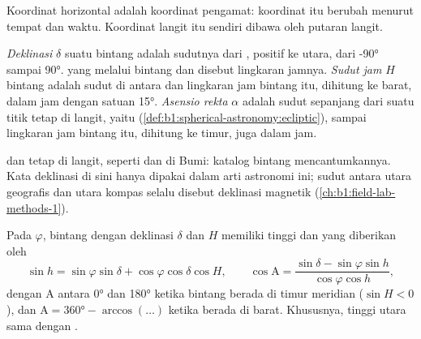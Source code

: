 Koordinat horizontal adalah koordinat pengamat: koordinat itu berubah menurut tempat dan waktu. Koordinat langit itu sendiri dibawa oleh putaran langit.

\begin{definition}\label{def:b1:spherical-astronomy:equatorial}
\emph{Deklinasi} $\delta$ suatu bintang adalah sudutnya dari , positif ke utara, dari \ang{-90} sampai \ang{90}.  yang melalui bintang dan  disebut lingkaran jamnya. \emph{Sudut jam} $H$ bintang adalah sudut di  antara  dan lingkaran jam bintang itu, dihitung ke barat, dalam jam dengan satuan \ang{15}. \emph{Asensio rekta} $\alpha$ adalah sudut sepanjang  dari suatu titik tetap di langit, yaitu  (\cref{def:b1:spherical-astronomy:ecliptic}), sampai lingkaran jam bintang itu, dihitung ke timur, juga dalam jam.
\end{definition}

 dan  tetap di langit, seperti  dan  di Bumi: katalog bintang mencantumkannya. Kata deklinasi di sini hanya dipakai dalam arti astronomi ini; sudut antara utara geografis dan utara kompas selalu disebut deklinasi magnetik (\cref{ch:b1:field-lab-methods-1}).

\begin{proposition}\label{prop:b1:spherical-astronomy:transform}
Pada  $\varphi$, bintang dengan deklinasi $\delta$ dan  $H$ memiliki tinggi dan  yang diberikan oleh
\[
  \sin h = \sin\varphi\sin\delta + \cos\varphi\cos\delta\cos H,
  \qquad
  \cos\mathrm{A} = \frac{\sin\delta - \sin\varphi\sin h}{\cos\varphi\cos h},
\]
dengan $\mathrm{A}$ antara \ang{0} dan \ang{180} ketika bintang berada di timur meridian ($\sin H < 0$), dan $\mathrm{A} = \ang{360} - \arccos(\dots)$ ketika berada di barat. Khususnya, tinggi  utara sama dengan .
\end{proposition}

